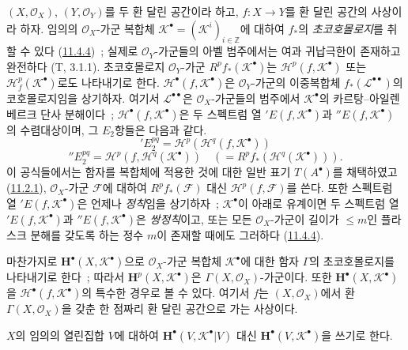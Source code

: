 \begin{env}[12.4.1]
\label{0.12.4.1-fr}
$(X,\mathcal O_X)$, $(Y,\mathcal O_Y)$를 두 환 달린 공간이라 하고,
$f:X\to Y$를 환 달린 공간의 사상이라 하자. 임의의
$\mathcal O_X$-가군 복합체
$\mathcal K^\bullet=(\mathcal K^i)_{i\in\mathbb Z}$에 대하여
$f_*$의 \emph{초코호몰로지}를 취할 수 있다
(\hyperref[0.11.4.4-fr]{11.4.4})~; 실제로 $\mathcal O_Y$-가군들의 아벨
범주에서는 여과 귀납극한이 존재하고 완전하다 (T, 3.1.1).
초코호몰로지 $\mathcal O_Y$-가군 $R^p f_*(\mathcal K^\bullet)$는
$\mathcal H^p(f,\mathcal K^\bullet)$ 또는
$\mathcal H_f^p(\mathcal K^\bullet)$로도 나타내기로 한다.
$\mathcal H^\bullet(f,\mathcal K^\bullet)$은
$\mathcal O_Y$-가군의 이중복합체 $f_*(\mathcal L^{\bullet\bullet})$의
코호몰로지임을 상기하자. 여기서 $\mathcal L^{\bullet\bullet}$은
$\mathcal O_X$-가군들의 범주에서 $\mathcal K^\bullet$의
카르탕--아일렌베르크 단사 분해이다~;
$\mathcal H^\bullet(f,\mathcal K^\bullet)$은 두 스펙트럼 열
${}'E(f,\mathcal K^\bullet)$과 ${}''E(f,\mathcal K^\bullet)$의
수렴대상이며, 그 $E_2$항들은 다음과 같다.
\begin{equation}
\label{0.12.4.1.1-fr}
\tag{12.4.1.1}
{}'E_2^{pq}=\mathcal H^p(\mathcal H^q(f,\mathcal K^\bullet))
\end{equation}
\begin{equation}
\label{0.12.4.1.2-fr}
\tag{12.4.1.2}
{}''E_2^{pq}=\mathcal H^p(f,\mathcal H^q(\mathcal K^\bullet))
\quad(=R^p f_*(\mathcal H^q(\mathcal K^\bullet))).
\end{equation}
이 공식들에서는 함자를 복합체에 적용한 것에 대한 일반 표기
$T(A^\bullet)$를 채택하였고
(\hyperref[0.11.2.1-fr]{11.2.1}), $\mathcal O_X$-가군
$\mathcal F$에 대하여 $R^p f_*(\mathcal F)$ 대신
$\mathcal H^p(f,\mathcal F)$를 쓴다. 또한 스펙트럼 열
${}'E(f,\mathcal K^\bullet)$은 언제나 \emph{정칙}임을 상기하자~;
$\mathcal K^\bullet$이 아래로 유계이면 두 스펙트럼 열
${}'E(f,\mathcal K^\bullet)$과 ${}''E(f,\mathcal K^\bullet)$은
\emph{쌍정칙}이고,
또는 모든 $\mathcal O_X$-가군이 길이가 $\leq m$인 플라스크 분해를
갖도록 하는 정수 $m$이 존재할 때에도 그러하다
(\hyperref[0.11.4.4-fr]{11.4.4}).
\end{env}

\begin{env}[12.4.2]
\label{0.12.4.2-fr}
마찬가지로 $\mathbf H^\bullet(X,\mathcal K^\bullet)$으로
$\mathcal O_X$-가군 복합체 $\mathcal K^\bullet$에 대한 함자
$\Gamma$의 초코호몰로지를 나타내기로 한다~; 따라서
$\mathbf H^p(X,\mathcal K^\bullet)$은
$\Gamma(X,\mathcal O_X)$-가군이다. 또한
$\mathbf H^\bullet(X,\mathcal K^\bullet)$을
$\mathcal H^\bullet(f,\mathcal K^\bullet)$의 특수한 경우로 볼 수 있다.
여기서 $f$는 $(X,\mathcal O_X)$에서 환
$\Gamma(X,\mathcal O_X)$을 갖춘 한 점짜리 환 달린 공간으로 가는
사상이다.

$X$의 임의의 열린집합 $V$에 대하여
$\mathbf H^\bullet(V,\mathcal K^\bullet|V)$ 대신
$\mathbf H^\bullet(V,\mathcal K^\bullet)$을 쓰기로 한다.
\end{env}

